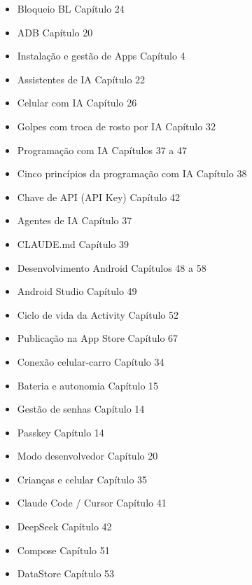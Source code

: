 


\begin{itemize}
  \item Bloqueio BL Capítulo 24
  \item ADB Capítulo 20
  \item Instalação e gestão de Apps Capítulo 4
  \item Assistentes de IA Capítulo 22
  \item Celular com IA Capítulo 26
  \item Golpes com troca de rosto por IA Capítulo 32
  \item Programação com IA Capítulos 37 a 47
  \item Cinco princípios da programação com IA Capítulo 38
  \item Chave de API (API Key) Capítulo 42
  \item Agentes de IA Capítulo 37
  \item CLAUDE.md Capítulo 39
  \item Desenvolvimento Android Capítulos 48 a 58
  \item Android Studio Capítulo 49
  \item Ciclo de vida da Activity Capítulo 52
  \item Publicação na App Store Capítulo 67
\end{itemize}


\begin{itemize}
  \item Conexão celular-carro Capítulo 34
  \item Bateria e autonomia Capítulo 15
  \item Gestão de senhas Capítulo 14
  \item Passkey Capítulo 14
  \item Modo desenvolvedor Capítulo 20
  \item Crianças e celular Capítulo 35
  \item Claude Code / Cursor Capítulo 41
  \item DeepSeek Capítulo 42
  \item Compose Capítulo 51
  \item DataStore Capítulo 53
\end{itemize}

